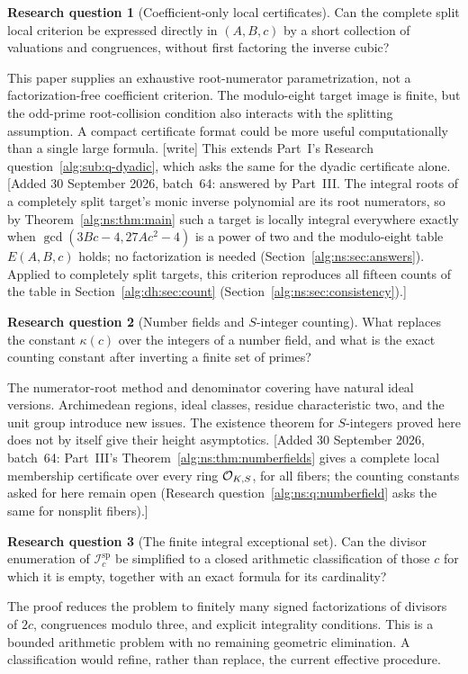 \documentclass[11pt]{article}
\numberwithin{equation}{section}
\theoremstyle{plain}
\theoremstyle{plain}
\theoremstyle{plain}
\theoremstyle{definition}
\theoremstyle{definition}
\newtheorem{question}[question]{Research question}
\theoremstyle{definition}
\theoremstyle{remark}
\newcommand{\wtag}{\textup{[write]}}%
\newcommand{\Isplit}{\mathcal I^{\mathrm{sp}}}
\begin{document}
\begin{question}[Coefficient-only local certificates]\label{alg:dh:q:coefficient}
Can the complete split local criterion be expressed directly in
$(A,B,c)$ by a short collection of valuations and congruences, without
first factoring the inverse cubic?
\end{question}
This paper supplies an exhaustive root-numerator parametrization, not a
factorization-free coefficient criterion. The modulo-eight target image
is finite, but the odd-prime root-collision condition also interacts
with the splitting assumption. A compact certificate format could be
more useful computationally than a single large formula.
\wtag{} This extends Part~I's Research question~\ref{alg:sub:q-dyadic},
which asks the same for the dyadic certificate alone.
[Added 30 September 2026, batch~64: answered by Part~III. The integral
roots of a completely split target's monic inverse polynomial are its
root numerators, so by Theorem~\ref{alg:ns:thm:main} such a target is
locally integral everywhere exactly when $\gcd(3Bc-4,27Ac^2-4)$ is a
power of two and the modulo-eight table $E(A,B,c)$ holds; no
factorization is needed (Section~\ref{alg:ns:sec:answers}). Applied to
completely split targets, this criterion reproduces all fifteen counts
of the table in Section~\ref{alg:dh:sec:count}
(Section~\ref{alg:ns:sec:consistency}).]

\begin{question}[Number fields and $S$-integer counting]\label{alg:dh:q:numberfield}
What replaces the constant $\kappa(c)$ over the integers of a number
field, and what is the exact counting constant after inverting a finite
set of primes?
\end{question}
The numerator-root method and denominator covering have natural ideal
versions. Archimedean regions, ideal classes, residue characteristic two,
and the unit group introduce new issues. The existence theorem for
$S$-integers proved here does not by itself give their height asymptotics.
[Added 30 September 2026, batch~64: Part~III's
Theorem~\ref{alg:ns:thm:numberfields} gives a complete local membership
certificate over every ring $\mathcal O_{K,S}$, for all fibers; the counting
constants asked for here remain open (Research
question~\ref{alg:ns:q:numberfield} asks the same for nonsplit fibers).]

\begin{question}[The finite integral exceptional set]\label{alg:dh:q:exceptions}
Can the divisor enumeration of $\Isplit_c$ be simplified to a closed
arithmetic classification of those $c$ for which it is empty, together
with an exact formula for its cardinality?
\end{question}
The proof reduces the problem to finitely many signed factorizations of
divisors of $2c$, congruences modulo three, and explicit integrality
conditions. This is a bounded arithmetic problem with no remaining
geometric elimination. A classification would refine, rather than
replace, the current effective procedure.
\end{document}
